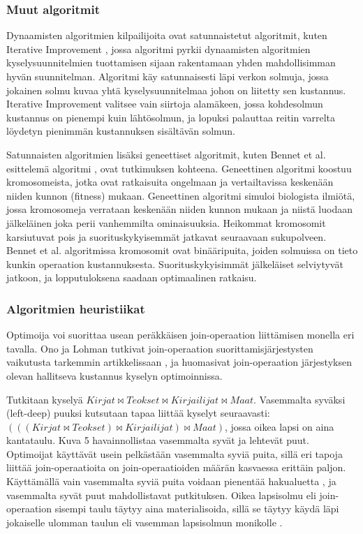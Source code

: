 \documentclass[finnish]{tktltiki2}
\theoremstyle{definition}
\theoremstyle{remark}
\begin{document}
\subsubsection{Muut algoritmit}
Dynaamisten algoritmien kilpailijoita ovat satunnaistetut algoritmit, kuten Iterative Improvement \cite{nahar1986simulated}, jossa algoritmi pyrkii dynaamisten algoritmien kyselysuunnitelmien tuottamisen sijaan rakentamaan yhden mahdollisimman hyvän suunnitelman. Algoritmi käy satunnaisesti läpi verkon solmuja, jossa jokainen solmu kuvaa yhtä kyselysuunnitelmaa johon on liitetty sen kustannus. Iterative Improvement valitsee vain siirtoja alamäkeen, jossa kohdesolmun kustannus on pienempi kuin lähtösolmun, ja lopuksi palauttaa reitin varrelta löydetyn pienimmän kustannuksen sisältävän solmun.

Satunnaisten algoritmien lisäksi geneettiset algoritmit, kuten Bennet et al. esittelemä algoritmi \cite{bennett1991genetic}, ovat tutkimuksen kohteena. Geneettinen algoritmi koostuu kromosomeista, jotka ovat ratkaisuita ongelmaan ja vertailtavissa keskenään niiden kunnon (fitness) mukaan. Geneettinen algoritmi simuloi biologista ilmiötä, jossa kromosomeja verrataan keskenään niiden kunnon mukaan ja niistä luodaan jälkeläinen joka perii vanhemmilta ominaisuuksia. Heikommat kromosomit karsiutuvat pois ja suorituskykyisemmät jatkavat seuraavaan sukupolveen. Bennet et al. algoritmissa kromosomit ovat binääripuita, joiden solmuissa on tieto kunkin operaation kustannuksesta. Suorituskykyisimmät jälkeläiset selviytyvät jatkoon, ja lopputuloksena saadaan optimaalinen ratkaisu. 
\subsubsection{Algoritmien heuristiikat}
Optimoija voi suorittaa usean peräkkäisen join-operaation liittämisen monella eri tavalla. Ono ja Lohman tutkivat join-operaation suorittamisjärjestysten vaikutusta tarkemmin artikkelissaan \cite{ono1990}, ja huomasivat join-operaation järjestyksen olevan hallitseva kustannus kyselyn optimoinnissa. 

Tutkitaan kyselyä $Kirjat \Join Teokset \Join Kirjailijat \Join Maat$. Vasemmalta syväksi (left-deep) puuksi kutsutaan tapaa liittää kyselyt seuraavasti: $(((Kirjat \Join Teokset) \Join Kirjailijat) \Join Maat)$, jossa oikea lapsi on aina kantataulu. Kuva 5 havainnollistaa vasemmalta syvät ja lehtevät puut. Optimoijat käyttävät usein pelkästään vasemmalta syviä puita, sillä eri tapoja liittää join-operaatioita on join-operaatioiden määrän kasvaessa erittäin paljon. Käyttämällä vain vasemmalta syviä puita voidaan pienentää hakualuetta \cite{ioannidis1991left}, ja vasemmalta syvät puut mahdollistavat putkituksen. Oikea lapsisolmu eli join-operaation sisempi taulu täytyy aina materialisoida, sillä se täytyy käydä läpi jokaiselle ulomman taulun eli vasemman lapsisolmun monikolle \cite{ramakrishnan2003database}. 
\end{document}
